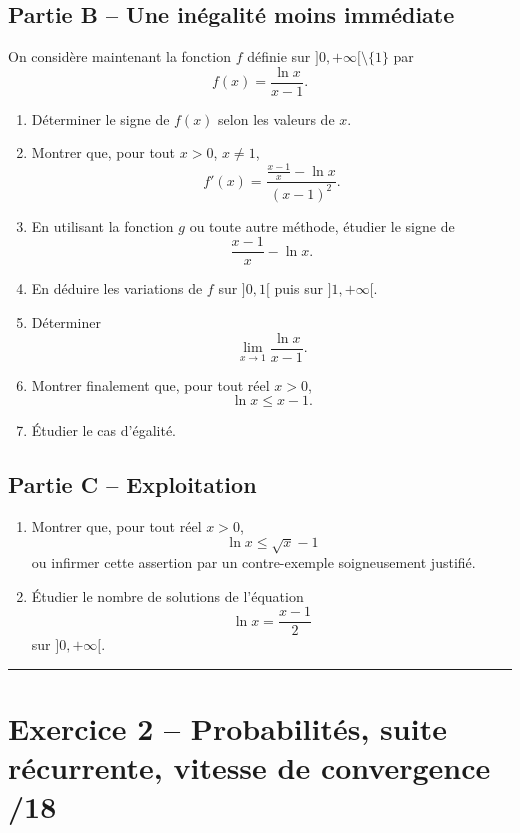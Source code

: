 \documentclass[11pt,a4paper]{article}
\begin{document}
\subsection*{Partie B -- Une inégalité moins immédiate}
On considère maintenant la fonction \(f\) définie sur \(]0,+\infty[\setminus\{1\}\) par
\[
f(x)=\frac{\ln x}{x-1}.
\]

\begin{enumerate}[label=\textbf{1.\arabic*}, resume, leftmargin=1.6em]
    \item Déterminer le signe de \(f(x)\) selon les valeurs de \(x\).
    \item Montrer que, pour tout \(x>0\), \(x\neq 1\),
    \[
    f'(x)=\frac{\frac{x-1}{x}-\ln x}{(x-1)^2}.
    \]
    \item En utilisant la fonction \(g\) ou toute autre méthode, étudier le signe de
    \[
    \frac{x-1}{x}-\ln x.
    \]
    \item En déduire les variations de \(f\) sur \(]0,1[\) puis sur \(]1,+\infty[\).
    \item Déterminer
    \[
    \lim_{x\to 1}\frac{\ln x}{x-1}.
    \]
    \item Montrer finalement que, pour tout réel \(x>0\),
    \[
    \ln x \le x-1.
    \]
    \item Étudier le cas d'égalité.
\end{enumerate}

\subsection*{Partie C -- Exploitation}
\begin{enumerate}[label=\textbf{1.\arabic*}, resume, leftmargin=1.6em]
    \item Montrer que, pour tout réel \(x>0\),
    \[
    \ln x \le \sqrt{x}-1
    \]
    ou infirmer cette assertion par un contre-exemple soigneusement justifié.
    \item Étudier le nombre de solutions de l'équation
    \[
    \ln x = \frac{x-1}{2}
    \]
    sur \(]0,+\infty[\).
\end{enumerate}

\vspace{0.5em}
\hrule
\vspace{0.6em}

\section*{Exercice 2 -- Probabilités, suite récurrente, vitesse de convergence \hfill /18}
\end{document}
